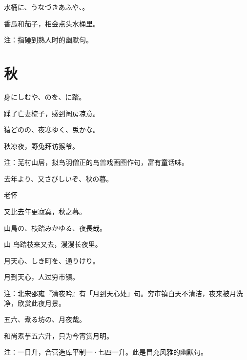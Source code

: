 \begin{haiku}
    {\FH 水桶に、うなづきあふや、。}

    {\FK 香瓜和茄子，相会点头水桶里。}

    {\FT 注：指碰到熟人时的幽默句。}
\end{haiku}

\section{\FK 秋}

\setcounter{haikucounter}{0}

\begin{haiku}
    {\FH 身にしむや、のを、に踏。}

    {\FK 踩了亡妻梳子，感到闺房凉意。}
\end{haiku}

\begin{haiku}
    {\FH 猿どのの、夜寒ゆく、兎かな。}

    {\FK 秋凉夜，野兔拜访猴爷。}

    {\FT 注：芜村山居，拟鸟羽僧正的鸟兽戏画图作句，富有童话味。}
\end{haiku}

\begin{haiku}
    {\FH 去年より、又さびしいぞ、秋の暮。}

    {\FK 老怀}

    {\FK 又比去年更寂寞，秋之暮。}
\end{haiku}

\begin{haiku}
    {\FH 山鳥の、枝踏みかゆる、夜長哉。}

    {\FK 山 鸟踏枝来又去，漫漫长夜里。}
\end{haiku}

\begin{haiku}
    {\FH 月天心、しき町を、通りけり。}

    {\FK 月到天心，人过穷市镇。}

    {\FT 注：北宋邵雍『清夜吟』有「月到天心处」句。穷市镇白天不清洁，夜来被月洗净，欣赏此夜月景。}
\end{haiku}

\begin{haiku}
    {\FH 五六、煮る坊の、月夜哉。}

    {\FK 和尚煮芋五六升，只为今宵赏月明。}

    {\FT 注：一日升，合营造库平制一·七四一升。此是冒充风雅的幽默句。}
\end{haiku}

